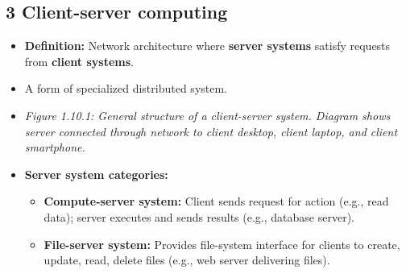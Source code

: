 \documentclass{article}
\begin{document}
\subsection*{3 Client-server computing}
\begin{itemize}
    \item \textbf{Definition:} Network architecture where \textbf{server systems} satisfy requests from \textbf{client systems}.
    \item A form of specialized distributed system.
    \item \textit{Figure 1.10.1: General structure of a client-server system. Diagram shows server connected through network to client desktop, client laptop, and client smartphone.}
    \item \textbf{Server system categories:}
    \begin{itemize}
        \item \textbf{Compute-server system:} Client sends request for action (e.g., read data); server executes and sends results (e.g., database server).
        \item \textbf{File-server system:} Provides file-system interface for clients to create, update, read, delete files (e.g., web server delivering files).
    \end{itemize}
\end{itemize}
\end{document}

